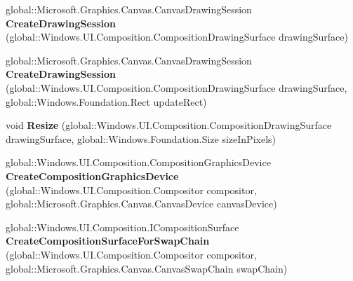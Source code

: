 \begin{DoxyCompactItemize}
global\+::\+Microsoft.\+Graphics.\+Canvas.\+Canvas\+Drawing\+Session {\bfseries Create\+Drawing\+Session} (global\+::\+Windows.\+U\+I.\+Composition.\+Composition\+Drawing\+Surface drawing\+Surface)
\item 
\mbox{\label{interface_microsoft_1_1_graphics_1_1_canvas_1_1_u_i_1_1_composition_1_1_i_canvas_composition_statics_a3be55117be22745ae6372f082447a79b}} 
global\+::\+Microsoft.\+Graphics.\+Canvas.\+Canvas\+Drawing\+Session {\bfseries Create\+Drawing\+Session} (global\+::\+Windows.\+U\+I.\+Composition.\+Composition\+Drawing\+Surface drawing\+Surface, global\+::\+Windows.\+Foundation.\+Rect update\+Rect)
\item 
\mbox{\label{interface_microsoft_1_1_graphics_1_1_canvas_1_1_u_i_1_1_composition_1_1_i_canvas_composition_statics_aa321ab037c7b505b333681f0b3bdc829}} 
void {\bfseries Resize} (global\+::\+Windows.\+U\+I.\+Composition.\+Composition\+Drawing\+Surface drawing\+Surface, global\+::\+Windows.\+Foundation.\+Size size\+In\+Pixels)
\item 
\mbox{\label{interface_microsoft_1_1_graphics_1_1_canvas_1_1_u_i_1_1_composition_1_1_i_canvas_composition_statics_abc5bb79cc44eecbedc66ea29c5052d3d}} 
global\+::\+Windows.\+U\+I.\+Composition.\+Composition\+Graphics\+Device {\bfseries Create\+Composition\+Graphics\+Device} (global\+::\+Windows.\+U\+I.\+Composition.\+Compositor compositor, global\+::\+Microsoft.\+Graphics.\+Canvas.\+Canvas\+Device canvas\+Device)
\item 
\mbox{\label{interface_microsoft_1_1_graphics_1_1_canvas_1_1_u_i_1_1_composition_1_1_i_canvas_composition_statics_a6803bff12a2a0f2d9c35cdac60868b7b}} 
global\+::\+Windows.\+U\+I.\+Composition.\+I\+Composition\+Surface {\bfseries Create\+Composition\+Surface\+For\+Swap\+Chain} (global\+::\+Windows.\+U\+I.\+Composition.\+Compositor compositor, global\+::\+Microsoft.\+Graphics.\+Canvas.\+Canvas\+Swap\+Chain swap\+Chain)
\item 
\mbox{\label{interface_microsoft_1_1_graphics_1_1_canvas_1_1_u_i_1_1_composition_1_1_i_canvas_composition_statics_ad6745a005de8b7c161ff1c151591a3bb}} 

\end{DoxyCompactItemize}
